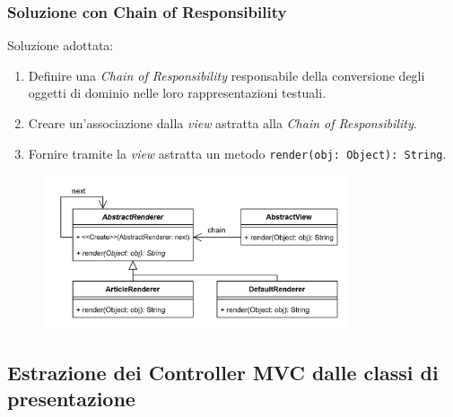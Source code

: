 \begin{frame}
  \frametitle{Soluzione con Chain of Responsibility}

  Soluzione adottata:
  \begin{enumerate}
    \item Definire una \emph{Chain of Responsibility} responsabile della conversione degli oggetti
    di dominio nelle loro rappresentazioni testuali.
    \item Creare un'associazione dalla \emph{view} astratta alla \emph{Chain of Responsibility}.
    \item Fornire tramite la \emph{view} astratta un metodo \texttt{render(obj: Object): String}.
  \end{enumerate}

  \begin{figure}
    \includegraphics[width=0.8\textwidth]{img/chain.png}
  \end{figure}
\end{frame}

\subsection{Estrazione dei Controller MVC dalle classi di presentazione}
